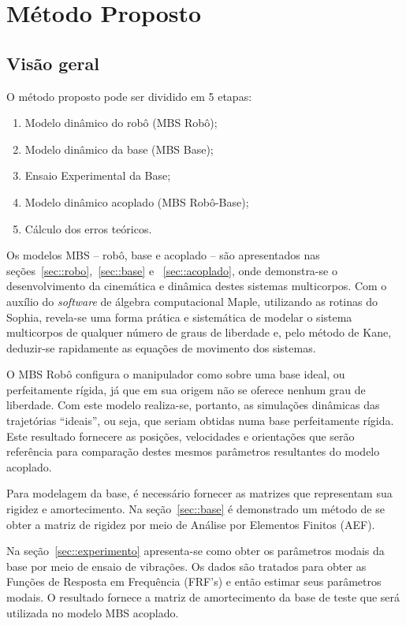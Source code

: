 \chapter{Método Proposto}



\section{Visão geral}

O método proposto pode ser dividido em 5 etapas:
%
\begin{enumerate}
  \item Modelo dinâmico do robô (MBS Robô);
  \item Modelo dinâmico da base (MBS Base);
  \item Ensaio Experimental da Base;
  \item Modelo dinâmico acoplado (MBS Robô-Base);
  \item Cálculo dos erros teóricos.
\end{enumerate}

Os modelos MBS -- robô, base e  acoplado -- são apresentados nas
seções~\ref{sec::robo},~\ref{sec::base} e ~\ref{sec::acoplado}, onde
demonstra-se o desenvolvimento da cinemática e dinâmica destes sistemas
multicorpos.
Com o auxílio do \textit{software} de álgebra computacional Maple, utilizando as
rotinas do Sophia, revela-se uma forma prática e sistemática de modelar o
sistema multicorpos de qualquer número de graus de liberdade e, pelo método de
Kane, deduzir-se rapidamente as equações de movimento dos sistemas.

O MBS Robô configura o manipulador como sobre uma base ideal, ou perfeitamente
rígida, já que em sua origem não se oferece nenhum grau de liberdade. Com este
modelo realiza-se, portanto, as simulações dinâmicas das trajetórias ``ideais'',
ou seja, que seriam obtidas numa base perfeitamente rígida. Este resultado
fornecere as posições, velocidades e orientações que serão referência para
comparação destes mesmos parâmetros resultantes do modelo acoplado.

Para modelagem da base, é necessário fornecer as matrizes que representam sua
rigidez e amortecimento. Na seção~\ref{sec::base} é demonstrado um método de se
obter a matriz de rigidez por meio de Análise por Elementos Finitos (AEF).

Na seção~\ref{sec::experimento} apresenta-se como obter os parâmetros modais da
base por meio de ensaio de vibrações. Os dados são tratados para obter as
Funções de Resposta em Frequência (FRF's) e então estimar seus parâmetros
modais. O resultado fornece a matriz de amortecimento da base de teste que será
utilizada no modelo MBS acoplado.

